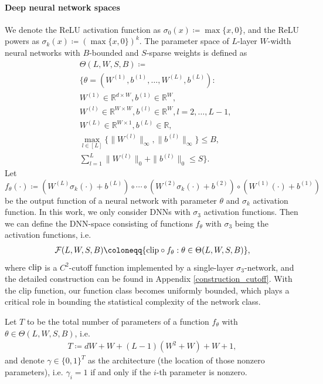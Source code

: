 \documentclass{article}
\newcommand{\R}{\mathbb{R}}
\newcommand{\F}{\mathcal{F}}
\newcommand{\clip}{\textnormal{clip}}
\theoremstyle{plain}
\theoremstyle{definition}
\theoremstyle{remark}
\begin{document}
\paragraph{Deep neural network spaces} We denote the ReLU activation function as $\sigma_0(x) \coloneqq \max\{x, 0\}$, and the ReLU powers as $\sigma_k(x) \coloneqq (\max\{x, 0\})^k$. 
The parameter space of $L$-layer $W$-width neural networks with $B$-bounded and $S$-sparse weights is defined as
\begin{align*}
    & \Theta(L, W, S, B) \coloneqq \\   & \big\{   \theta = (W^{(1)}, b^{(1)}, \ldots, W^{(L)}, b^{(L)}): \\
     & W^{(1)} \in \R^{d \times W}, b^{(1)} \in \R^W,  \\
     & W^{(l)} \in \R^{W \times W}, b^{(l)} \in \R^W, l = 2, \ldots,L-1, \\
     & W^{(L)} \in \R^{W \times 1}, b^{(L)} \in \R, \\
     & \max_{l \in [L]}\{\|W^{(l)}\|_\infty, \|b^{(l)}\|_\infty\} \leq B, \\
     & \sum_{l = 1}^L \|W^{(l)}\|_0 + \|b^{(l)}\|_0 \leq S \big\}. 
\end{align*}
Let $f_\theta(\cdot) \coloneqq (W^{(L)} \sigma_k (\cdot) + b^{(L)}) \circ \cdots \circ (W^{(2)} \sigma_k (\cdot) + b^{(2)}) \circ (W^{(1)} (\cdot) + b^{(1)})$ be the output function of a neural network with parameter $\theta$ and $\sigma_k$ activation function. In this work, we only consider DNNs with $\sigma_3$ activation functions.  Then we can define the DNN-space consisting of functions $f_\theta$ with $\sigma_3$ being the activation functions, i.e. 
\begin{align*}
    \F(L, W, S, B) \coloneqq \{\clip \circ f_\theta : \theta \in \Theta(L, W, S, B)\},
\end{align*}
where $\clip$ is a $C^2$-cutoff function implemented by a single-layer $\sigma_3$-network, and the detailed construction can be found in Appendix \ref{construction_cutoff}. With the clip function, our function class becomes  uniformly bounded, which plays a critical role in bounding the statistical complexity of the network class. 

Let $T$ to be the total number of parameters of a function $f_\theta$ with $\theta \in \Theta(L, W, S, B)$, i.e.
\begin{align*}
    T \coloneqq dW + W + (L-1)(W^2 + W) + W + 1,
\end{align*}
and denote $\gamma \in \{0, 1\}^T$ as the architecture (the location of those nonzero parameters), i.e. $\gamma_i = 1$ if and only if the $i$-th parameter is nonzero. 
\end{document}
